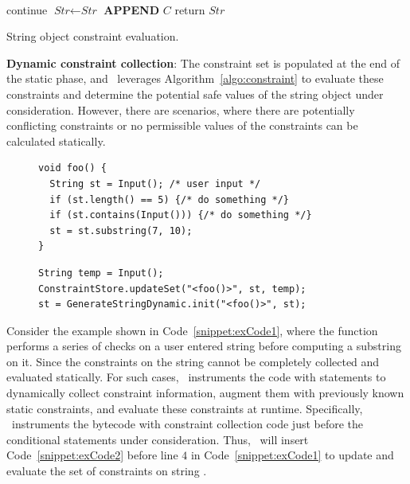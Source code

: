 \begin{mylist}
\begin{algorithm}[t]
{     {
         {\\
          \mytab  continue
        }
        $\textit{Str} \leftarrow \textit{Str}$ {\bf APPEND} $C$
    }
    return $\textit{Str}$
}
\caption{String object constraint evaluation.}
\label{algo:constraint}
\end{algorithm}

 \item \textbf{Dynamic constraint collection}: The constraint set is populated
at the end of the static phase, and \tool\ leverages
Algorithm~\ref{algo:constraint} to evaluate these constraints and determine the
potential safe values of the string object under consideration. However, there
are scenarios, where there are potentially conflicting constraints or no
permissible values of the constraints can be calculated statically.

\lstset{language=Java, caption=Code with dynamic string constraints., label =
snippet:exCode1, firstnumber =1}
\begin{figure}[t]
\begin{lstlisting}
void foo() {
  String st = Input(); /* user input */
  if (st.length() == 5) {/* do something */}
  if (st.contains(Input())) {/* do something */}
  st = st.substring(7, 10);
}
\end{lstlisting}
\end{figure}

\begin{figure}[t]
\begin{lstlisting}
String temp = Input();
ConstraintStore.updateSet("<foo()>", st, temp);
st = GenerateStringDynamic.init("<foo()>", st);
\end{lstlisting}
\end{figure}

Consider the example shown in Code~\ref{snippet:exCode1}, where the function
 performs a series of checks on a user entered string before computing
a substring on it. Since the constraints on the string  cannot be
completely collected and evaluated statically. For such cases, \tool\
instruments the code with statements to dynamically collect constraint
information, augment them with previously known static constraints, and evaluate
these constraints at runtime. Specifically, \tool\ instruments the bytecode
with constraint collection code just before the conditional statements under
consideration. Thus, \tool\ will insert Code~\ref{snippet:exCode2} before line
$4$ in Code~\ref{snippet:exCode1} to update and evaluate the set of constraints
on string \code{st}.

\end{mylist}

